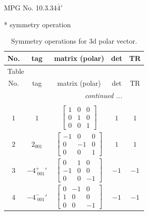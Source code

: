 \documentclass[fleqn,8pt]{jsarticle}
\begin{document}
\setcounter{MaxMatrixCols}{32}

\renewcommand{\tablename}{Table~}
\renewcommand{\figurename}{Figure~}
\begin{center}
\LARGE
MPG No. 10.3.34\quad$\bar{4}'$
\end{center}
* symmetry operation
\renewcommand{\arraystretch}{1.3}
\begin{longtable}{ccccc}
\caption{Symmetry operations for 3d polar vector.}
 \\
 \hline \hline
No. & tag & matrix (polar) & det & TR \\ \hline \endfirsthead

\multicolumn{4}{l}{\tablename\ \thetable{}} \\
 \hline \hline
No. & tag & matrix (polar) & det & TR \\ \hline \endhead

 \hline \hline
\multicolumn{4}{r}{\footnotesize\it continued ...} \\ \endfoot

 \hline \hline
\multicolumn{4}{r}{} \\ \endlastfoot

$ 1 $ & $ 1 $ & $ \begin{bmatrix} 1 & 0 & 0 \\ 0 & 1 & 0 \\ 0 & 0 & 1 \end{bmatrix} $ & $ 1 $ & $ 1 $ \\ \hline
$ 2 $ & $ 2{}_{001} $ & $ \begin{bmatrix} -1 & 0 & 0 \\ 0 & -1 & 0 \\ 0 & 0 & 1 \end{bmatrix} $ & $ 1 $ & $ 1 $ \\ \hline
$ 3 $ & $ -4^{+}_{\,\,001}{}' $ & $ \begin{bmatrix} 0 & 1 & 0 \\ -1 & 0 & 0 \\ 0 & 0 & -1 \end{bmatrix} $ & $ -1 $ & $ -1 $ \\ \hline
$ 4 $ & $ -4^{-}_{\,\,001}{}' $ & $ \begin{bmatrix} 0 & -1 & 0 \\ 1 & 0 & 0 \\ 0 & 0 & -1 \end{bmatrix} $ & $ -1 $ & $ -1 $ \\
\end{longtable}
\end{document}
